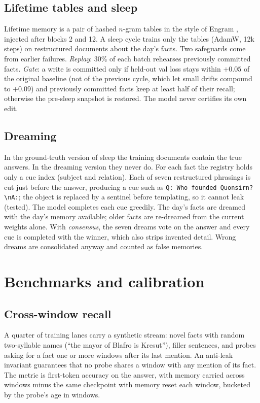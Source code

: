 \documentclass[11pt]{article}
\begin{document}
\subsection{Lifetime tables and sleep}
Lifetime memory is a pair of hashed $n$-gram tables in the style of Engram
\citep{cheng2026engram}, injected after blocks 2 and 12. A sleep cycle trains only the tables (AdamW, 12k steps) on restructured
documents about the day's facts. Two safeguards come from earlier failures.
\emph{Replay}: 30\% of each batch rehearses previously committed facts.
\emph{Gate}: a write is committed only if held-out val loss stays within
$+0.05$ of the original baseline (not of the previous cycle, which let small
drifts compound to $+0.09$) and previously committed facts keep at least half
of their recall; otherwise the pre-sleep snapshot is restored. The model never
certifies its own edit.

\subsection{Dreaming}
\label{sec:dreaming}
In the ground-truth version of sleep the training documents contain the true
answers. In the dreaming version they never do. For each fact the registry holds
only a cue index (subject and relation). Each of seven restructured phrasings
is cut just before the answer, producing a cue such as
\texttt{Q: Who founded Quonsirn?\textbackslash nA:}; the object is replaced by
a sentinel before templating, so it cannot leak (tested). The model completes
each cue greedily. The day's facts are dreamed with the day's memory available;
older facts are re-dreamed from the current weights alone. With
\emph{consensus}, the seven dreams vote on the answer and every cue is
completed with the winner, which also strips invented detail. Wrong dreams are
consolidated anyway and counted as false memories.

\section{Benchmarks and calibration}
\label{sec:calibration}
\subsection{Cross-window recall}
\label{sec:curriculum}
A quarter of training lanes carry a synthetic stream: novel facts with random
two-syllable names (``the mayor of Blafro is Kresut''), filler sentences, and
probes asking for a fact one or more windows after its last mention. An
anti-leak invariant guarantees that no probe shares a window with any mention
of its fact. The metric is first-token accuracy on the answer, with memory
carried across windows minus the same checkpoint with memory reset each window,
bucketed by the probe's age in windows.
\end{document}
